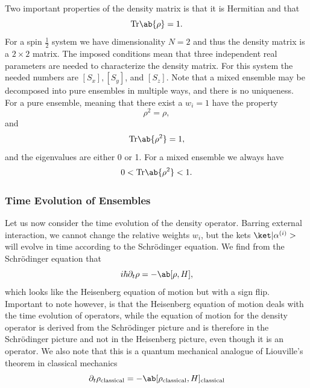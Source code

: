Two important properties of the density matrix is that it is Hermitian and that 
\begin{equation}
    \trace{\rho} = 1.
\end{equation}
For a spin $\frac{1}{2}$ system we have dimensionality $N=2$ and thus the density matrix is a $2\times 2$ matrix. The imposed conditions mean that three independent real parameters are needed to characterize the density matrix. For this system the needed numbers are $[S_x],[S_y]$, and $[S_z]$. Note that a mixed ensemble may be decomposed into pure ensembles in multiple ways, and there is no uniqueness. For a pure ensemble, meaning that there exist a $w_i = 1$ have the property
\begin{equation}
    \rho^2 = \rho,
\end{equation}
and 
\begin{equation}
    \trace{\rho^2} = 1,
\end{equation}
and the eigenvalues are either 0 or 1. For a mixed ensemble we always have
\begin{equation}
    0 < \trace{\rho^2} < 1.
\end{equation}

\subsubsection{Time Evolution of Ensembles}
Let us now consider the time evolution of the density operator. Barring external interaction, we cannot change the relative weights $w_i$, but the kets $\k{\alpha^{(i)}}$ will evolve in time according to the Schrödinger equation. We find from the Schrödinger equation that
\begin{equation}
    i\hbar \partial_t \rho = -\comm{\rho}{H},
\end{equation}
which looks like the Heisenberg equation of motion but with a sign flip. Important to note however, is that the Heisenberg equation of motion deals with the time evolution of operators, while the equation of motion for the density operator is derived from the Schrödinger picture and is therefore in the Schrödinger picture and not in the Heisenberg picture, even though it is an operator. We also note that this is a quantum mechanical analogue of Liouville's theorem in classical mechanics
\begin{equation}
    \partial_t \rho_\text{classical} = - \comm{\rho_\text{classical}}{H}_\text{classical}
\end{equation}

